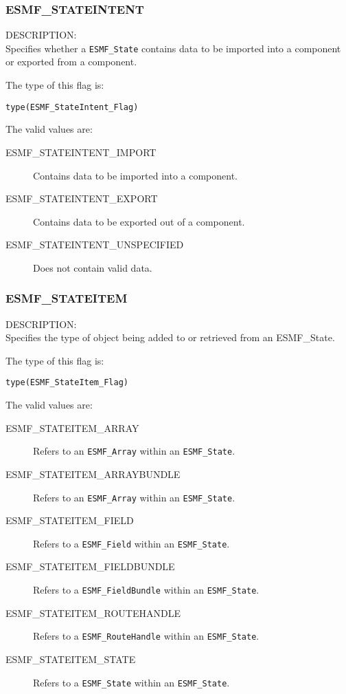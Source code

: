 
\subsubsection{ESMF\_STATEINTENT}
\label{const:stateintent}

{\sf DESCRIPTION:\\}
Specifies whether a {\tt ESMF\_State} contains data to be imported
into a component or exported from a component. 

The type of this flag is:

{\tt type(ESMF\_StateIntent\_Flag)}

The valid values are:
\begin{description}
   \item [ESMF\_STATEINTENT\_IMPORT] 
         Contains data to be imported into a component.
   \item [ESMF\_STATEINTENT\_EXPORT]
         Contains data to be exported out of a component.
   \item [ESMF\_STATEINTENT\_UNSPECIFIED]
         Does not contain valid data.
\end{description}

\subsubsection{ESMF\_STATEITEM}
\label{const:stateitem}

{\sf DESCRIPTION:\\}
Specifies the type of object being added to or retrieved from an
{ESMF\_State.}

The type of this flag is:

{\tt type(ESMF\_StateItem\_Flag)}

The valid values are:
\begin{description}
   \item [ESMF\_STATEITEM\_ARRAY]
         Refers to an {\tt ESMF\_Array} within an {\tt ESMF\_State}.
   \item [ESMF\_STATEITEM\_ARRAYBUNDLE]
         Refers to an {\tt ESMF\_Array} within an {\tt ESMF\_State}.
   \item [ESMF\_STATEITEM\_FIELD]
         Refers to a {\tt ESMF\_Field} within an {\tt ESMF\_State}.
   \item [ESMF\_STATEITEM\_FIELDBUNDLE] 
         Refers to a {\tt ESMF\_FieldBundle} within an {\tt ESMF\_State}.
   \item [ESMF\_STATEITEM\_ROUTEHANDLE] 
         Refers to a {\tt ESMF\_RouteHandle} within an {\tt ESMF\_State}.
   \item [ESMF\_STATEITEM\_STATE]
         Refers to a {\tt ESMF\_State} within an {\tt ESMF\_State}.
\end{description}












